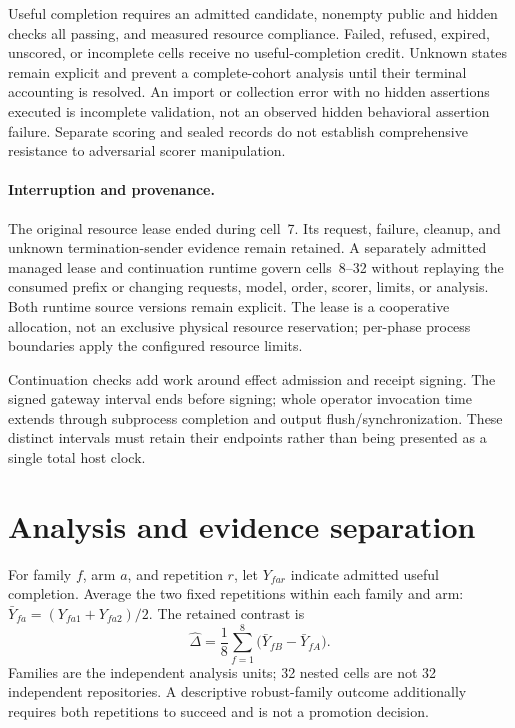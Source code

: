 \documentclass{article}
\begin{document}
Useful completion requires an admitted candidate, nonempty public and hidden
checks all passing, and measured resource compliance. Failed, refused,
expired, unscored, or incomplete cells receive no useful-completion credit.
Unknown states remain explicit and prevent a complete-cohort analysis until
their terminal accounting is resolved. An import or collection error with
no hidden assertions executed is incomplete validation, not an observed
hidden behavioral assertion failure. Separate scoring and sealed records do
not establish comprehensive resistance to adversarial scorer manipulation.

\paragraph{Interruption and provenance.}
The original resource lease ended during cell~7. Its request, failure, cleanup,
and unknown termination-sender evidence remain retained. A separately admitted
managed lease and continuation runtime govern cells~8--32 without replaying
the consumed prefix or changing requests, model, order, scorer, limits, or
analysis. Both runtime source versions remain explicit. The lease is a
cooperative allocation, not an exclusive physical resource reservation;
per-phase process boundaries apply the configured resource limits.

Continuation checks add work around effect admission and receipt signing.
The signed gateway interval ends before signing; whole operator invocation
time extends through subprocess completion and output flush/synchronization.
These distinct intervals must retain their endpoints rather than being
presented as a single total host clock.

\section{Analysis and evidence separation}
\label{sec:analysis-method}

For family $f$, arm $a$, and repetition $r$, let $Y_{far}$ indicate admitted
useful completion. Average the two fixed repetitions within each family and arm:
$\bar Y_{fa}=(Y_{fa1}+Y_{fa2})/2$. The retained contrast is
\[
  \widehat{\Delta}=\frac{1}{8}\sum_{f=1}^{8}
                   \bigl(\bar Y_{fB}-\bar Y_{fA}\bigr).
\]
Families are the independent analysis units; 32 nested cells are not 32
independent repositories. A descriptive robust-family outcome additionally
requires both repetitions to succeed and is not a promotion decision.
\end{document}
